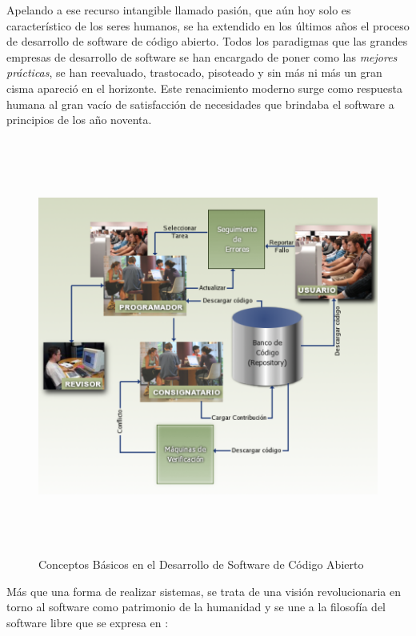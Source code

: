 Apelando a ese recurso intangible llamado pasión, que aún hoy solo es característico de los seres humanos, se ha extendido en los últimos años el proceso de desarrollo de software de código abierto. Todos los paradigmas que las grandes empresas de desarrollo de software se han encargado de poner como las \textit{mejores prácticas}, se han reevaluado, trastocado, pisoteado y sin más ni más un gran cisma apareció en el horizonte. Este renacimiento moderno surge como respuesta humana al gran vacío de satisfacción de necesidades que brindaba el software a principios de los año noventa.

\begin{figure}
 \centering
 \includegraphics[width=156mm, height=137mm]{proceso_fs.png}
 \caption{Conceptos Básicos en el Desarrollo de Software de Código Abierto}
\label{proceso_fs} 
\end{figure}

Más que una forma de realizar sistemas, se trata de una visión revolucionaria en torno al software como patrimonio de la humanidad y se une a la filosofía del software libre que se expresa en \cite{stallman2002}:

